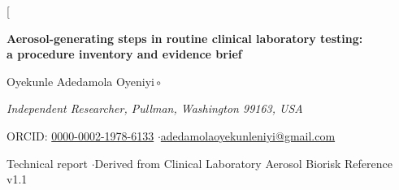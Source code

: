 \twocolumn[
\begin{@twocolumnfalse}
\begin{center}
{\large\bfseries Aerosol-generating steps in routine clinical laboratory testing:\\[2pt]
a procedure inventory and evidence brief\par}
\vspace{10pt}
{\normalsize Oyekunle Adedamola Oyeniyi\,\href{https://orcid.org/0000-0002-1978-6133}{\textcolor{linknavy}{$\circ$}}\par}
\vspace{3pt}
{\small\itshape Independent Researcher, Pullman, Washington 99163, USA\par}
\vspace{2pt}
{\footnotesize ORCID: \href{https://orcid.org/0000-0002-1978-6133}{0000-0002-1978-6133}
\quad$\cdot$\quad \href{mailto:adedamolaoyekunleniyi@gmail.com}{adedamolaoyekunleniyi@gmail.com}\par}
\vspace{4pt}
{\footnotesize Technical report \quad$\cdot$\quad Derived from Clinical Laboratory Aerosol Biorisk Reference v1.1\par}
\vspace{14pt}
\end{center}


\end{@twocolumnfalse}
